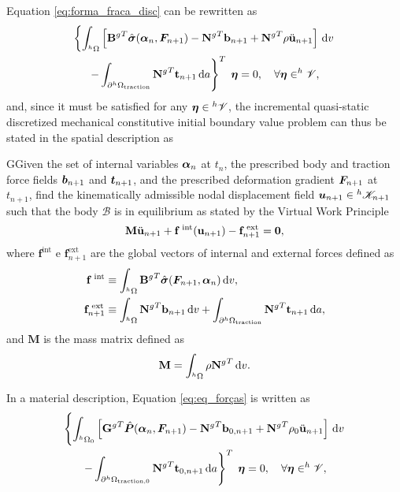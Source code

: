Equation \eqref{eq:forma_fraca_disc} can be rewritten as
\begin{multline}
    \left\{  \int_{^h\Omega}\left[{\mathbf B^g}^T \hat{\bm{\sigma}}(\bm{\alpha}_n, \bm{F}_{n+1})-{\mathbf N^g}^T\mathbf b_{n+1} +{\mathbf N^g}^T\rho\ddot{\mathbf u}_{n+1} \right]\,\mathrm{d} v \right. \\ \left. -\int_{\partial ^h\Omega_\text{traction}} {\mathbf N^g}^T \mathbf t_{n+1}\,\mathrm{d} a\right\}^T\;\bm{\eta} =0,\quad \forall \bm{\eta} \in ^h \mathscr{V}, \label{eq:eq_forças}
\end{multline}
and, since it must be satisfied for any $\bm{\eta} \in {}^h \mathscr{V}$, the incremental quasi-static discretized mechanical constitutive initial boundary value problem can thus be stated in the spatial description as
\begin{problem}
GGiven the set of internal variables $\bm{\alpha}_n$ at $t_n$, the prescribed body and traction force fields $\bm{b}_{n+1}$ and $\bm{t}_{n+1}$, and the prescribed deformation gradient $\bm{F}_{n+1}$ at $t_{n+1}$, find the kinematically admissible nodal displacement field $\bm{u}_{n+1}\in {^h\mathscr{K}_{n+1}}$ such that the body $\mathscr{B}$ is in equilibrium as stated by the Virtual Work Principle
\begin{equation}
    \mathbf M \ddot{\mathbf u}_{n+1} + \mathbf f^\text{\;int}(\mathbf u_{n+1})-\mathbf f^\text{\;ext}_{n+1}=\mathbf 0, \label{eq:equilibrium_spatial}
\end{equation}
where $\mathbf f^\text{int}$ e $\mathbf f^\text{ext}_{n+1}$ are the global vectors of internal and external forces defined as
\begin{align}
    \mathbf f^\text{\;int} &\equiv \int_{^h\Omega}{\mathbf B^g}^T \hat{\bm{\sigma}}(\bm{F}_{n+1}, \bm{\alpha}_n)\,\mathrm{d} v,\\
    \mathbf f^\text{\;ext}_{n+1} &\equiv \int_{^h\Omega}{\mathbf N^g}^T \mathbf b_{n+1}\,\mathrm{d} v + \int_{\partial^h\Omega_\text{traction}}{\mathbf N^g}^T \mathbf t_{n+1}\,\mathrm{d} a,
\end{align}
and $\mathbf M$ is the mass matrix defined as
\begin{equation}
  \mathbf M = \int_{{}^h\Omega} \rho {\mathbf{N}^g}^T \,\mathrm{d} v.
\end{equation}
\end{problem}
In a material description, Equation \eqref{eq:eq_forças} is written as
\begin{multline}
     \left\{  \int_{^h\Omega_0}\left[{\mathbf G^g}^T \hat{\bm{P}}(\bm{\alpha}_n, \bm{F}_{n+1})-{\mathbf N^g}^T \mathbf b_{0,n+1} + {\mathbf N^g}^T \rho_0\ddot{\mathbf u}_{n+1} \right]\,\mathrm{d} v \right.\\ \left.   -\int_{\partial ^h\Omega_\text{traction,0}} {\mathbf N^g}^T \mathbf t_{0,n+1}\,\mathrm{d} a\right\}^T\;\bm{\eta} =0,\quad \forall \bm{\eta} \in ^h \mathscr{V},
\end{multline}
